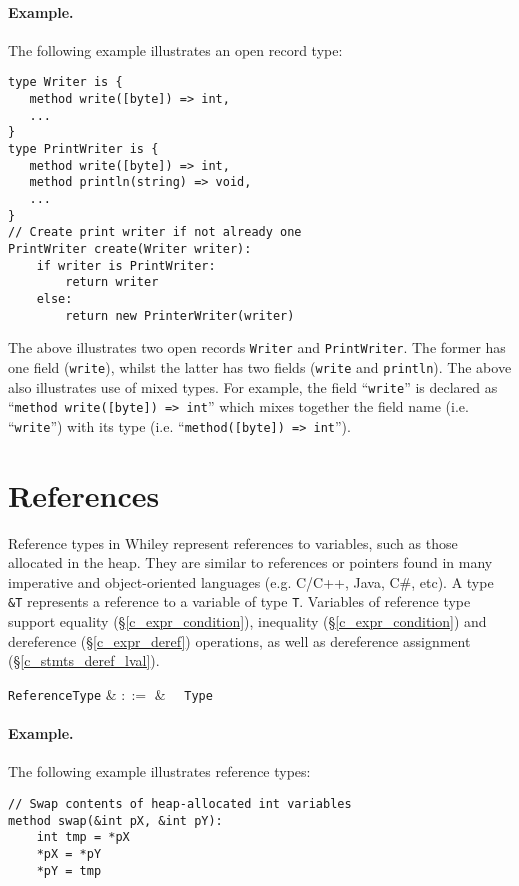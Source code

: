 \paragraph{Example.} The following example illustrates an open record type: 
\begin{lstlisting}
type Writer is { 
   method write([byte]) => int,
   ...
}
type PrintWriter is { 
   method write([byte]) => int,
   method println(string) => void,
   ...
}
// Create print writer if not already one
PrintWriter create(Writer writer):
    if writer is PrintWriter:
        return writer
    else:
        return new PrinterWriter(writer)
\end{lstlisting}
The above illustrates two open records \lstinline{Writer} and \lstinline{PrintWriter}.  The former has one field (\lstinline{write}), whilst the latter has two fields (\lstinline{write} and \lstinline{println}).  The above also illustrates use of mixed types.  For example, the field ``\lstinline{write}'' is declared as ``\lstinline{method write([byte]) => int}'' which mixes together the field name (i.e. ``\lstinline{write}'') with its type (i.e. ``\lstinline{method([byte]) => int}'').


\section{References}

Reference types in Whiley represent references to variables, such as those allocated in the heap.  They are similar to references or pointers found in many imperative and object-oriented languages (e.g. C/C++, Java, C\#, etc).  A type \lstinline{&T} represents a reference to a variable of type \lstinline{T}.  Variables of reference type support equality (\S\ref{c_expr_condition}), inequality (\S\ref{c_expr_condition}) and dereference (\S\ref{c_expr_deref}) operations, as well as dereference assignment (\S\ref{c_stmts_deref_lval}).

\begin{syntax}
  \verb+ReferenceType+ & $::=$ & \token{\&}\ \ \verb+Type+\\
\end{syntax}

\paragraph{Example.} The following example illustrates reference types:
\begin{lstlisting}
// Swap contents of heap-allocated int variables
method swap(&int pX, &int pY):
    int tmp = *pX
    *pX = *pY
    *pY = tmp
\end{lstlisting} 

